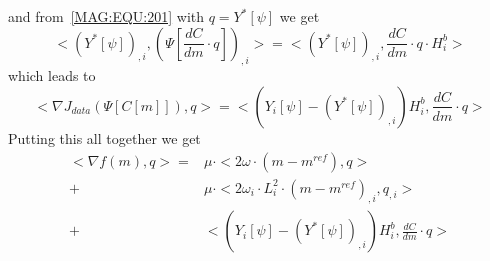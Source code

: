 and from~\ref{MAG:EQU:201} with $q=Y^*[\psi]$ we get
\begin{equation}\label{MAG:EQU:20e}
< (Y^*[\psi])_{,i},(\Psi[\frac{dC}{dm} \cdot q])_{,i} > = <(Y^*[\psi])_{,i} , \frac{dC}{dm} \cdot q \cdot H^b_i>
\end{equation}
which leads to 
\begin{equation}\label{MAG:EQU:202f}
< \nabla J_{data}(\Psi[C[m]]), q> = < ( Y_i[\psi] - (Y^*[\psi])_{,i} ) H^b_i,  \frac{dC}{dm} \cdot q>
\end{equation} 
Putting this all together we get
\begin{align}
< \nabla f(m),q> = &\mu \cdot < 2 \omega \cdot (m-m^{ref}), q>\nonumber\\
+ &\mu \cdot < 2 \omega_i \cdot L_i^2 \cdot (m-m^{ref})_{,i}, q_{,i}>\nonumber\\
+ &< ( Y_i[\psi] - (Y^*[\psi])_{,i} ) H^b_i,  \frac{dC}{dm} \cdot q>\label{MAG:EQU:202g}
\end{align}  


